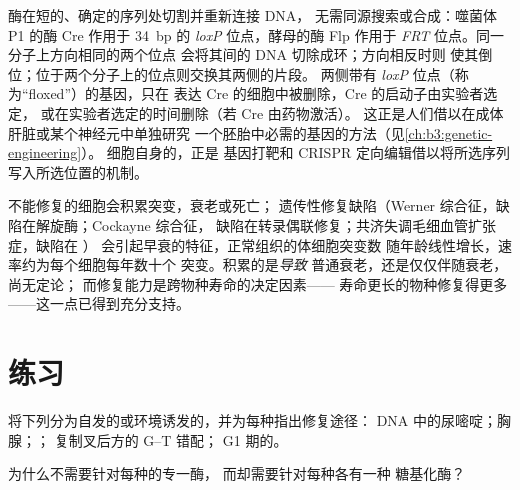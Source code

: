 \begin{proposition}[重组作为工具]\label{prop:b3:dna-repair:tools}
酶在短的、确定的序列处切割并重新连接 DNA，
无需同源搜索或合成：噬菌体 P1 的酶
Cre 作用于 \qty{34}{bp} 的 \emph{loxP} 位点，酵母的酶 Flp 作用于
\emph{FRT} 位点。同一分子上方向相同的两个位点
会将其间的 DNA 切除成环；方向相反时则
使其倒位；位于两个分子上的位点则交换其两侧的片段。
两侧带有 \emph{loxP} 位点（称为“floxed”）的基因，只在
表达 Cre 的细胞中被删除，Cre 的启动子由实验者选定，
或在实验者选定的时间删除（若 Cre 由药物激活）。
这正是人们借以在成体肝脏或某个神经元中单独研究
一个胚胎中必需的基因的方法（见\cref{ch:b3:genetic-engineering}）。
细胞自身的，正是
基因打靶和 CRISPR 定向编辑借以将所选序列
写入所选位置的机制。
\end{proposition}

\begin{remark}[修复与衰老]\label{rem:b3:dna-repair:ageing}
不能修复的细胞会积累突变，衰老或死亡；
遗传性修复缺陷（Werner 综合征，缺陷在解旋酶；Cockayne 综合征，
缺陷在转录偶联修复；共济失调毛细血管扩张症，缺陷在 ）
会引起早衰的特征，正常组织的体细胞突变数
随年龄线性增长，速率约为每个细胞每年数十个
突变。积累的是\emph{导致}
普通衰老，还是仅仅伴随衰老，尚无定论；
而修复能力是跨物种寿命的决定因素——
寿命更长的物种修复得更多——这一点已得到充分支持。
\end{remark}

\section{练习}

\begin{exercise}[$\star$]\label{exo:b3:dna-repair:1}
将下列分为自发的或环境诱发的，并为每种指出修复途径：
DNA 中的尿嘧啶；胸腺；；
复制叉后方的 G--T 错配；
G1 期的。
\end{exercise}

\begin{exercise}[$\star$]\label{exo:b3:dna-repair:2}
为什么不需要针对每种的专一酶，
而却需要针对每种各有一种
糖基化酶？
\end{exercise}

